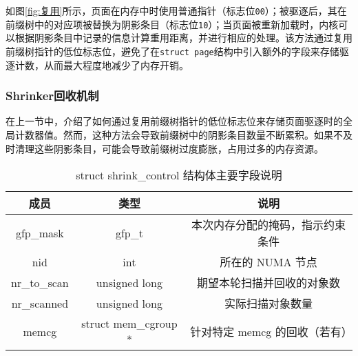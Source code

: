 如图\ref{fig:复用}所示，页面在内存中时使用普通指针（标志位\texttt{00}）；被驱逐后，其在前缀树中的对应项被替换为阴影条目（标志位\texttt{10}）；当页面被重新加载时，内核可以根据阴影条目中记录的信息计算重用距离，并进行相应的处理。该方法通过复用前缀树指针的低位标志位，避免了在\texttt{struct page}结构中引入额外的字段来存储驱逐计数，从而最大程度地减少了内存开销。


\subsubsection{Shrinker回收机制}

在上一节中，介绍了如何通过复用前缀树指针的低位标志位来存储页面驱逐时的全局计数器值。然而，这种方法会导致前缀树中的阴影条目数量不断累积。如果不及时清理这些阴影条目，可能会导致前缀树过度膨胀，占用过多的内存资源。
\begin{table}[htbp]
  \centering
  \caption{struct shrink\_control 结构体主要字段说明}
  \label{tab:shrink_control_struct}
  \begin{tabular}{ccc}
    \toprule
    \textbf{成员} & \textbf{类型} & \textbf{说明} \\
    \midrule
    gfp\_mask & gfp\_t & 本次内存分配的掩码，指示约束条件 \\
    nid & int & 所在的 NUMA 节点 \\
    nr\_to\_scan & unsigned long & 期望本轮扫描并回收的对象数 \\
    nr\_scanned & unsigned long & 实际扫描对象数量 \\
    memcg & struct mem\_cgroup * & 针对特定 memcg 的回收（若有） \\
    \bottomrule
  \end{tabular}
\end{table}

